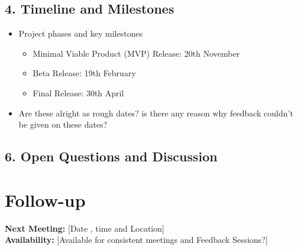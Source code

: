 \documentclass[11pt,a4paper]{article}
\begin{document}

\vspace{2em}

\subsection*{4. Timeline and Milestones \hfill}
\begin{itemize}[leftmargin=*]
    \item Project phases and key milestones
    \begin{itemize}
        \item Minimal Viable Product (MVP) Release: 20th November
        \item Beta Release: 19th February
        \item Final Release: 30th April
    \end{itemize}
    \item Are these alright as rough dates? is there any reason why feedback couldn't be given on these dates?
\end{itemize}

\vspace{2em}

\subsection*{6. Open Questions and Discussion \hfill }
\begin{itemize}[leftmargin=*]
\end{itemize}

\vspace{1em}

\section*{Follow-up}
\textbf{Next Meeting:} [Date , time and Location] \\
\textbf{Availability:} [Available for consistent meetings and Feedback Sessions?]
\end{document}
